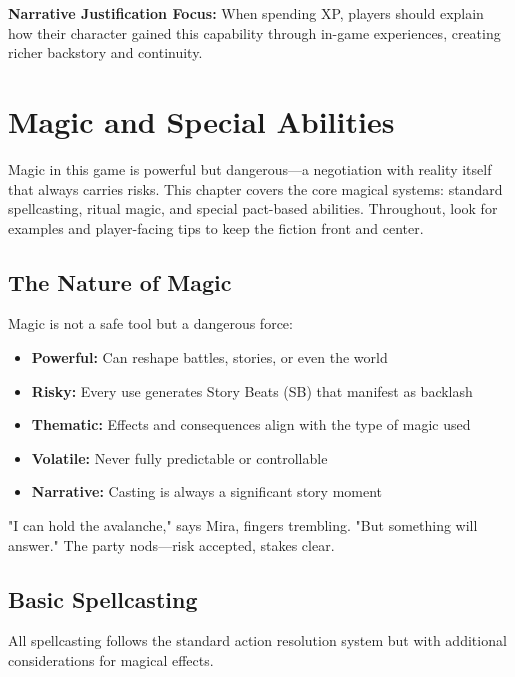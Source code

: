 \documentclass[11pt,twoside,openany]{book}
\begin{document}
\textbf{Narrative Justification Focus:} When spending XP, players should explain how their character gained this capability through in-game experiences, creating richer backstory and continuity.

\chapter{Magic and Special Abilities} \label{ch:magic}

Magic in this game is powerful but dangerous—a negotiation with reality itself that always carries risks. This chapter covers the core magical systems: standard spellcasting, ritual magic, and special pact-based abilities. Throughout, look for examples and player-facing tips to keep the fiction front and center.

\section*{The Nature of Magic} 

Magic is not a safe tool but a dangerous force:
\begin{itemize}
\item \textbf{Powerful:} Can reshape battles, stories, or even the world
\item \textbf{Risky:} Every use generates Story Beats (SB) that manifest as backlash
\item \textbf{Thematic:} Effects and consequences align with the type of magic used
\item \textbf{Volatile:} Never fully predictable or controllable
\item \textbf{Narrative:} Casting is always a significant story moment
\end{itemize}

\begin{tcolorbox}[colback=gray!5!white, colframe=gray!75!black, title=Table Vignette, fonttitle=\bfseries]
"I can hold the avalanche," says Mira, fingers trembling. "But something will answer." The party nods—risk accepted, stakes clear.
\end{tcolorbox}

\section*{Basic Spellcasting} 

All spellcasting follows the standard action resolution system but with additional considerations for magical effects.
\end{document}
